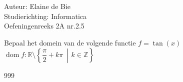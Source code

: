 \documentclass[a4paper]{article}
\begin{document}
  
\noindent \large Auteur: Elaine de Bie \\
\noindent \large Studierichting: Informatica\\
\noindent \large Oefeningenreeks 2A nr.2.5\\

\medskip


\normalsize


Bepaal het domein van de volgende functie $f = \tan(x)$\\

$\operatorname{dom} f: \mathbb{R} \setminus\left\{\dfrac{\pi}{2} + k\pi\,\middle|\, k\in\mathbb{Z}\right\}$\\





\begin{thebibliography}{999}
\end{thebibliography}
\end{document}
